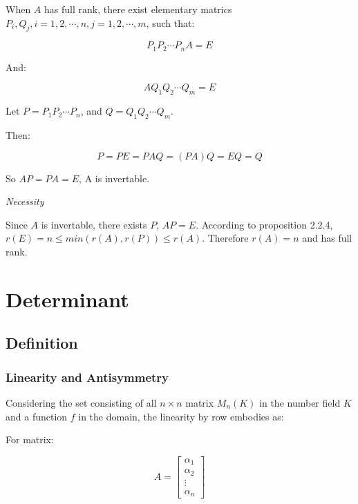 \documentclass{article}
\begin{document}
When \(A\) has full rank, there exist elementary matrics
\(P_i, Q_j, i = 1, 2, \cdots, n, j=1,2,\cdots,m\), such that:

\begin{equation}
    P_1P_2\cdots P_nA = E
\end{equation}

And:

\begin{equation}
    AQ_1Q_2\cdots Q_m = E
\end{equation}

Let \(P=P_1P_2\cdots P_n\), and \(Q=Q_1Q_2\cdots Q_m\).

Then:

\begin{equation}
P=PE=PAQ=(PA)Q=EQ=Q
\end{equation}

So \(AP=PA=E\), A is invertable.

\vspace{2mm}

\textit{Necessity}

Since \(A\) is invertable, there exists \(P\), \(AP=E\).
According to proposition 2.2.4, \(r(E)=n\leq min(r(A), r(P))\leq r(A)\).
Therefore \(r(A)=n\) and has full rank.


\section{Determinant}

\subsection{Definition}

\subsubsection{Linearity and Antisymmetry}

Considering the set consisting of all 
\(n \times n\) matrix \(M_n(K)\) in the number field \(K\) and
a function \(f\) in the domain,
the linearity by row embodies as:

For matrix:

\begin{equation*}
A=
\begin{bmatrix}
    \alpha_1 \\
    \alpha_2 \\
    \vdots \\
    \alpha_n
\end{bmatrix}
\end{equation*}
\end{document}
